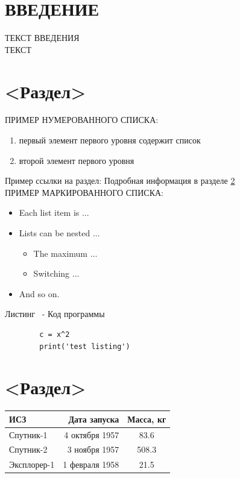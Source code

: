 \documentclass[12pt, left=30mm, right=10mm, top=20mm, bottom=20mm]{templateReportBMSTU}
\begin{document}
	\normalsize
	\setcounter{page}{2}

	\pagebreak

	\renewcommand{\contentsname}{\normalsize\bfseries\centering СОДЕРЖАНИЕ}
	\small
	\tableofcontents
	\normalsize

	\pagebreak

	\section*{ВВЕДЕНИЕ}
		ТЕКСТ ВВЕДЕНИЯ
		\\ ТЕКСТ
		\pagebreak

	\section{<Раздел>}

	ПРИМЕР НУМЕРОВАННОГО СПИСКА:
	\begin{enumerate} 
  		\item первый элемент первого уровня содержит список 
		\item  второй элемент первого уровня
	\end{enumerate}
	Пример ссылки на раздел: Подробная информация в разделе \ref{section1}
	\\ ПРИМЕР МАРКИРОВАННОГО СПИСКА:
	\begin{itemize}
		\item Each list item is ...
		\item Lists can be nested ...
			\begin{itemize}
				\item The maximum ...
				\item Switching ...
			\end{itemize}
		\item And so on.
	\end{itemize}
	
	Листинг \thenumberlisting \ - Код программы
	\begin{lstlisting}
		c = x^2
		print('test listing')
	\end{lstlisting}
	\pagebreak

	\section{<Раздел>}  \label{section1}

	\begin{tabular}{ | p{100pt} | r | c | }
		\hline
		ИСЗ & Дата запуска & Масса, кг  \\ \hline
		Спутник-1 & 4 октября 1957 & 83.6 \\
		Спутник-2 & 3 ноября 1957 & 508.3 \\
		Эксплорер-1 & 1 февраля 1958 & 21.5 \\
		\hline
	\end{tabular}
\end{document}
